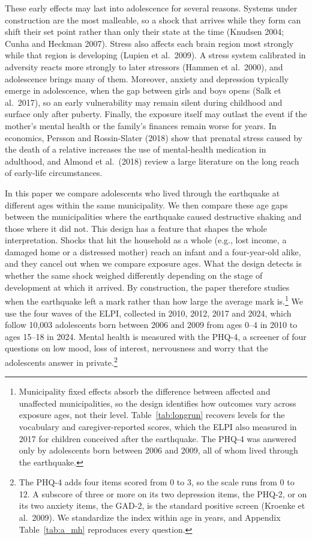 \documentclass[12pt]{article}
\begin{document}
These early effects may last into adolescence for several reasons. Systems
under construction are the most malleable, so a shock that arrives while
they form can shift their set point rather than only their state at the
time (Knudsen 2004; Cunha and Heckman 2007). Stress also affects each brain
region most strongly while that region is developing (Lupien et al.\ 2009).
A stress system calibrated in adversity reacts more strongly to later
stressors (Hammen et al.\ 2000), and adolescence brings many of them.
Moreover, anxiety and depression typically emerge in adolescence, when the
gap between girls and boys opens (Salk et al.\ 2017), so an early
vulnerability may remain silent during childhood and surface only after
puberty. Finally, the exposure itself may outlast the event if the mother's
mental health or the family's finances remain worse for years. In
economics, Persson and Rossin-Slater (2018) show that prenatal stress caused
by the death of a relative increases the use of mental-health medication in
adulthood, and Almond et al.\ (2018) review a large literature on the long
reach of early-life circumstances.

In this paper we compare adolescents who lived through the earthquake at
different ages within the same municipality. We then compare these age gaps
between the municipalities where the earthquake caused destructive shaking
and those where it did not. This design has a feature that shapes the whole
interpretation. Shocks that hit the household as a whole (e.g., lost income,
a damaged home or a distressed mother) reach an infant and a four-year-old
alike, and they cancel out when we compare exposure ages. What the design
detects is whether the same shock weighed differently depending on the
stage of development at which it arrived. By construction, the paper
therefore studies when the earthquake left a mark rather than how large the
average mark is.\footnote{Municipality fixed effects absorb the difference
between affected and unaffected municipalities, so the design identifies
how outcomes vary across exposure ages, not their level.
Table~\ref{tab:longrun} recovers levels for the vocabulary and
caregiver-reported scores, which the ELPI also measured in 2017 for
children conceived after the earthquake. The PHQ-4 was answered only by
adolescents born between 2006 and 2009, all of whom lived through the
earthquake.} We use the four waves of the ELPI, collected in 2010, 2012,
2017 and 2024, which follow 10,003 adolescents born between 2006 and 2009
from ages 0--4 in 2010 to ages 15--18 in 2024. Mental health is measured
with the PHQ-4, a screener of four questions on low mood, loss of interest,
nervousness and worry that the adolescents answer in private.\footnote{The
PHQ-4 adds four items scored from 0 to 3, so the scale runs from 0 to 12. A
subscore of three or more on its two depression items, the PHQ-2, or on its
two anxiety items, the GAD-2, is the standard positive screen (Kroenke et
al.\ 2009). We standardize the index within age in years, and Appendix
Table~\ref{tab:a_mh} reproduces every question.}
\end{document}

